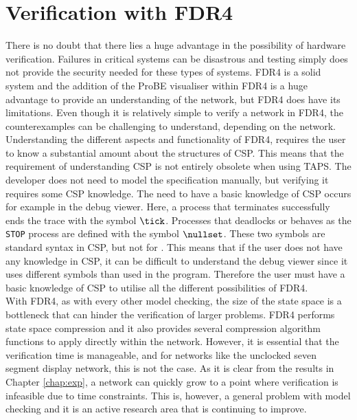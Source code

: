 \section{Verification with FDR4}
There is no doubt that there lies a huge advantage in the possibility of hardware verification. Failures in critical systems can be disastrous and testing simply does not provide the security needed for these types of systems. FDR4 is a solid system and the addition of the ProBE visualiser within FDR4 is a huge advantage to provide an understanding of the network, but FDR4 does have its limitations. Even though it is relatively simple to verify a network in FDR4, the counterexamples can be challenging to understand, depending on the network. Understanding the different aspects and functionality of FDR4, requires the user to know a substantial amount about the structures of CSP. This means that the requirement of understanding CSP is not entirely obsolete when using TAPS. The developer does not need to model the specification manually, but verifying it requires some CSP knowledge. The need to have a basic knowledge of CSP occurs for example in the debug viewer. Here, a process that terminates successfully ends the trace with the symbol $\tick$. Processes that deadlocks or behaves as the \texttt{STOP} process are defined with the symbol $\nullset$. These two symbols are standard syntax in CSP, but not for \cspm{}. This means that if the user does not have any knowledge in CSP, it can be difficult to understand the debug viewer since it uses different symbols than used in the \cspm{} program. Therefore the user must have a basic knowledge of CSP to utilise all the different possibilities of FDR4. \\

With FDR4, as with every other model checking, the size of the state space is a bottleneck that can hinder the verification of larger problems. FDR4 performs state space compression and it also provides several compression algorithm functions to apply directly within the \cspm{} network.
However, it is essential that the verification time is manageable, and for networks like the unclocked seven segment display network, this is not the case. As it is clear from the results in Chapter \ref{chap:exp}, a network can quickly grow to a point where verification is infeasible due to time constraints. This is, however, a general problem with model checking and it is an active research area that is continuing to improve.